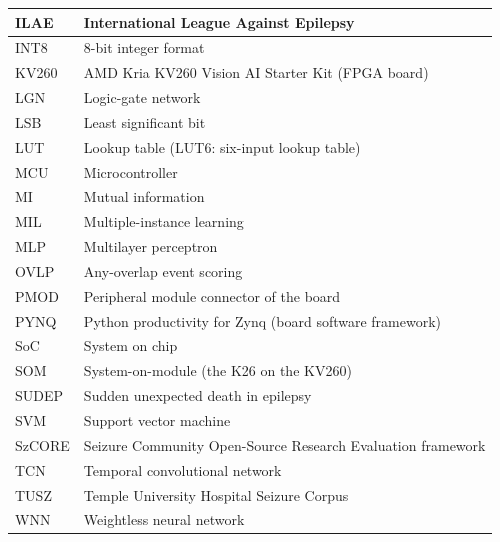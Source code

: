 {\begin{longtable}{|p{32mm}|p{102mm}|}
\hline
ILAE & International League Against Epilepsy\\
\hline
INT8 & 8-bit integer format\\
\hline
KV260 & AMD Kria KV260 Vision AI Starter Kit (FPGA board)\\
\hline
LGN & Logic-gate network\\
\hline
LSB & Least significant bit\\
\hline
LUT & Lookup table (LUT6: six-input lookup table)\\
\hline
MCU & Microcontroller\\
\hline
MI & Mutual information\\
\hline
MIL & Multiple-instance learning\\
\hline
MLP & Multilayer perceptron\\
\hline
OVLP & Any-overlap event scoring\\
\hline
PMOD & Peripheral module connector of the board\\
\hline
PYNQ & Python productivity for Zynq (board software framework)\\
\hline
SoC & System on chip\\
\hline
SOM & System-on-module (the K26 on the KV260)\\
\hline
SUDEP & Sudden unexpected death in epilepsy\\
\hline
SVM & Support vector machine\\
\hline
SzCORE & Seizure Community Open-Source Research Evaluation framework\\
\hline
TCN & Temporal convolutional network\\
\hline
TUSZ & Temple University Hospital Seizure Corpus\\
\hline
WNN & Weightless neural network\\
\hline
\end{longtable}}
